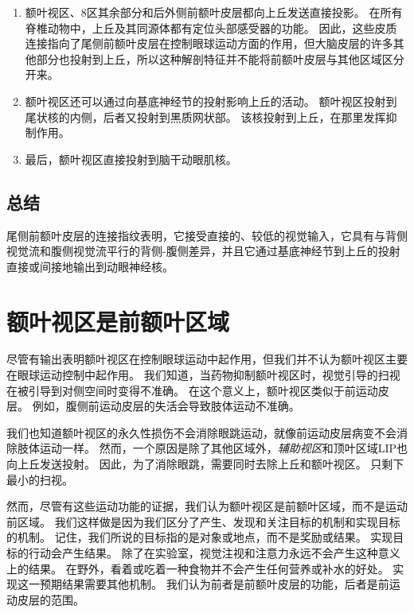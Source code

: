 \begin{enumerate}
	\item 额叶视区\cite{kunzle1976projection,huerta1986frontal}、8区其余部分\cite{fries1984cortical}和后外侧前额叶皮层\cite{selemon1988common}都向上丘发送直接投影。
	在所有脊椎动物中，上丘及其同源体都有定位头部感受器的功能。
	因此，这些皮质连接指向了尾侧前额叶皮层在控制眼球运动方面的作用，但大脑皮层的许多其他部分也投射到上丘\cite{leichnetz1981prefrontal,fries1984cortical}，所以这种解剖特征并不能将前额叶皮层与其他区域区分开来。
	\item 额叶视区还可以通过向基底神经节的投射影响上丘的活动。
	额叶视区投射到尾状核的内侧\cite{stanton1988frontal}，后者又投射到黑质网状部\cite{hedreen1991organization}。
	该核投射到上丘，在那里发挥抑制作用\cite{hikosaka1985modification}。
	\item 最后，额叶视区直接投射到脑干动眼肌核\cite{segraves1992activity,yan2001overlap}。
\end{enumerate}



\subsection{总结}

尾侧前额叶皮层的连接指纹表明，它接受直接的、较低的视觉输入，它具有与背侧视觉流和腹侧视觉流平行的背侧-腹侧差异，并且它通过基底神经节到上丘的投射直接或间接地输出到动眼神经核。



\section{额叶视区是前额叶区域}

尽管有输出表明额叶视区在控制眼球运动中起作用，但我们并不认为额叶视区主要在眼球运动控制中起作用。
我们知道，当药物抑制额叶视区时，视觉引导的扫视在被引导到对侧空间时变得不准确\cite{sommer1997reversible}。
在这个意义上，额叶视区类似于前运动皮层。
例如，腹侧前运动皮层的失活会导致肢体运动不准确\cite{kurata1994differential}。


我们也知道额叶视区的永久性损伤不会消除眼跳运动，就像前运动皮层病变不会消除肢体运动一样。
然而，一个原因是除了其他区域外，\textit{辅助视区}\cite{huerta1990supplementary}和顶叶区域LIP\cite{holloway2002brief}也向上丘发送投射。
因此，为了消除眼跳，需要同时去除上丘和额叶视区\cite{schiller1979effects,schiller1987effect}。
只剩下最小的扫视。


然而，尽管有这些运动功能的证据，我们认为额叶视区是前额叶区域，而不是运动前区域。
我们这样做是因为我们区分了产生、发现和关注目标的机制和实现目标的机制。
记住，我们所说的目标指的是对象或地点，而不是奖励或结果。
实现目标的行动会产生结果。
除了在实验室，视觉注视和注意力永远不会产生这种意义上的结果。
在野外，看着或吃着一种食物并不会产生任何营养或补水的好处。
实现这一预期结果需要其他机制。
我们认为前者是前额叶皮层的功能，后者是前运动皮层的范围。


